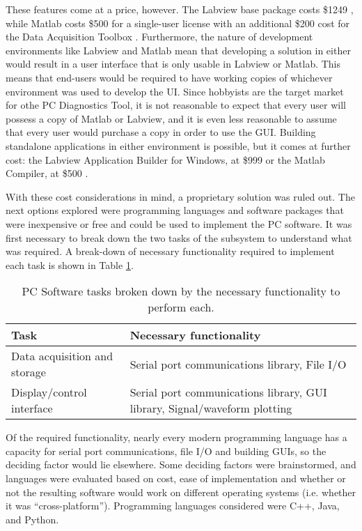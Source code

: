 These features come at a price, however. The Labview base package costs 
\$1249 \cite{web:labviewbase}, while Matlab costs \$500 for a single-user license with an 
additional \$200 cost for the Data Acquisition Toolbox \cite{web:matlab}\cite{web:matlabdaq}. 
Furthermore, the nature of development environments like Labview and Matlab mean that 
developing a solution in either would result in a user interface that is only usable in 
Labview or Matlab. This means that end-users would be required to have working 
copies of whichever environment was used to develop the UI. Since hobbyists are 
the target market for othe PC Diagnostics Tool, it is not reasonable to expect 
that every user will possess a copy of Matlab or Labview, and it is even less 
reasonable to assume that every user would purchase a copy in order to use the 
GUI. Building standalone applications in either environment is possible, but it 
comes at further cost: the Labview Application Builder for Windows, at \$999 \cite{web:labviewbase} 
or the Matlab Compiler, at \$500 \cite{web:matlabcompiler}. 

With these cost considerations in mind, a proprietary solution was ruled out. 
The next options explored were programming languages and software packages that 
were inexpensive or free and could be used to implement the PC software. It was 
first necessary to break down the two tasks of the subsystem to understand what 
was required. A break-down of necessary functionality required to implement each
 task is shown in Table \ref{tab:required functionality}.


\begin{table}[h]
\caption[Software functionality]{PC Software tasks broken down by the necessary 
functionality to perform each.}
\begin{tabular}{l | p{7cm}}
	Task & Necessary functionality \\ \hline
	Data acquisition and storage & Serial port communications library, File I/O \\ \hline
	Display/control interface & Serial port communications library, GUI library, 
	Signal/waveform plotting
\end{tabular}
\label{tab:required functionality}
\end{table}


Of the required functionality, nearly every modern programming language has a 
capacity for serial port communications, file I/O and building GUIs, so the deciding 
factor would lie elsewhere. Some deciding factors were brainstormed, and languages were 
evaluated based on cost, ease of implementation and whether or not the resulting 
software would work on different operating systems (i.e. whether it was ``cross-platform'').  
Programming languages considered were C++, Java, and Python. 

